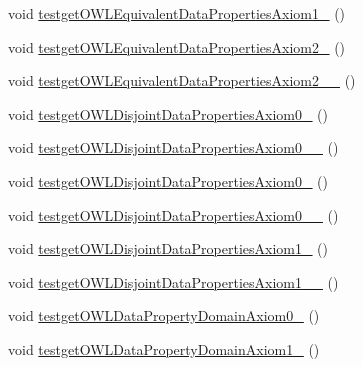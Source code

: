 \begin{DoxyCompactItemize}
\item 
void \hyperlink{classorg_1_1semanticweb_1_1owlapi_1_1api_1_1test_1_1_null_check_test_case_a0bf4c5cf7756235de4407273d2dc0cd3}{testget\-O\-W\-L\-Equivalent\-Data\-Properties\-Axiom1\-\_} ()
\item 
void \hyperlink{classorg_1_1semanticweb_1_1owlapi_1_1api_1_1test_1_1_null_check_test_case_a3a725525673ec6977d7a8311db44952f}{testget\-O\-W\-L\-Equivalent\-Data\-Properties\-Axiom2\-\_} ()
\item 
void \hyperlink{classorg_1_1semanticweb_1_1owlapi_1_1api_1_1test_1_1_null_check_test_case_abe8b1555bc765c3a7f48267b324ef244}{testget\-O\-W\-L\-Equivalent\-Data\-Properties\-Axiom2\-\_\-\_} ()
\item 
void \hyperlink{classorg_1_1semanticweb_1_1owlapi_1_1api_1_1test_1_1_null_check_test_case_aac37583a2af3b6353e5c7a747ce5c37a}{testget\-O\-W\-L\-Disjoint\-Data\-Properties\-Axiom0\-\_} ()
\item 
void \hyperlink{classorg_1_1semanticweb_1_1owlapi_1_1api_1_1test_1_1_null_check_test_case_a815f38b00ce07062974f82850a635d14}{testget\-O\-W\-L\-Disjoint\-Data\-Properties\-Axiom0\-\_\-\_} ()
\item 
void \hyperlink{classorg_1_1semanticweb_1_1owlapi_1_1api_1_1test_1_1_null_check_test_case_a8bc11131f633247ae37fe8c33879931e}{testget\-O\-W\-L\-Disjoint\-Data\-Properties\-Axiom0\-\_} ()
\item 
void \hyperlink{classorg_1_1semanticweb_1_1owlapi_1_1api_1_1test_1_1_null_check_test_case_a58690d616c950d8d992aec2c411392ba}{testget\-O\-W\-L\-Disjoint\-Data\-Properties\-Axiom0\-\_\-\_} ()
\item 
void \hyperlink{classorg_1_1semanticweb_1_1owlapi_1_1api_1_1test_1_1_null_check_test_case_a3cd34f6e362422e377511a43a081f91f}{testget\-O\-W\-L\-Disjoint\-Data\-Properties\-Axiom1\-\_} ()
\item 
void \hyperlink{classorg_1_1semanticweb_1_1owlapi_1_1api_1_1test_1_1_null_check_test_case_a0ff2784b6f3679e1447108163b07928a}{testget\-O\-W\-L\-Disjoint\-Data\-Properties\-Axiom1\-\_\-\_} ()
\item 
void \hyperlink{classorg_1_1semanticweb_1_1owlapi_1_1api_1_1test_1_1_null_check_test_case_a8f05a6e4404930adfb5145230d8c3918}{testget\-O\-W\-L\-Data\-Property\-Domain\-Axiom0\-\_} ()
\item 
void \hyperlink{classorg_1_1semanticweb_1_1owlapi_1_1api_1_1test_1_1_null_check_test_case_af9cd879cbd357d3ec12a267a8588b59d}{testget\-O\-W\-L\-Data\-Property\-Domain\-Axiom1\-\_} ()

\end{DoxyCompactItemize}
